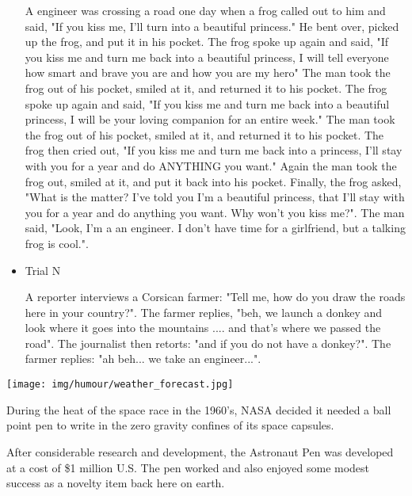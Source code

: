 \begin{itemize}
A engineer was crossing a road one day when a frog called out to him and said, "If you kiss me, I'll turn into a beautiful princess." He bent over, picked up the frog, and put it in his pocket. The frog spoke up again and said, "If you kiss me and turn me back into a beautiful princess, I will tell everyone how smart and brave you are and how you are my hero" The man took the frog out of his pocket, smiled at it, and returned it to his pocket. The frog spoke up again and said, "If you kiss me and turn me back into a beautiful princess, I will be your loving companion for an entire week." The man took the frog out of his pocket, smiled at it, and returned it to his pocket. The frog then cried out, "If you kiss me and turn me back into a princess, I'll stay with you for a year and do ANYTHING you want." Again the man took the frog out, smiled at it, and put it back into his pocket. Finally, the frog asked, "What is the matter? I've told you I'm a beautiful princess, that I'll stay with you for a year and do anything you want. Why won't you kiss me?". The man said, "Look, I'm a an engineer. I don't have time for a girlfriend, but a talking frog is cool.".

	\item Trial N 

A reporter interviews a Corsican farmer: "Tell me, how do you draw the roads here in your country?". The farmer replies, "beh, we launch a donkey and look where it goes into the mountains .... and that's where we passed the road". The journalist then retorts: "and if you do not have a donkey?". The farmer replies: "ah beh... we take an engineer...".
\end{itemize}

	\begin{center}\underline{\hspace{5 cm}}\end{center}
	
	\begin{center}
	\texttt{[image: img/humour/weather\_forecast.jpg]}
	\end{center}
		
	During the heat of the space race in the 1960's, NASA decided it needed a ball point pen to write in the zero gravity confines of its space capsules.
	
	After considerable research and development, the Astronaut Pen was developed at a cost of \$1 million U.S. The pen worked and also enjoyed some modest success as a novelty item back here on earth.
	

